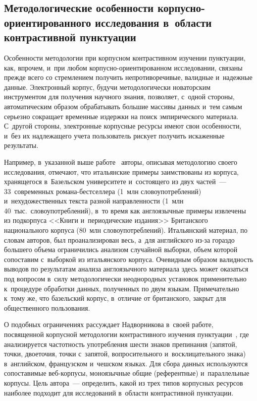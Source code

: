 \begin{multicols}{2}
\vspace*{-6pt}
    
    \section{Методологические особенности  
корпусно-ориентированного исследования в~области 
контрастивной пунктуации}

\vspace*{-3pt}
  
  Особенности методологии при корпусном контрастивном изуче\-нии 
пунктуации, как, впрочем, и~при любом 
 кор\-пус\-но-ори\-ен\-ти\-ро\-ван\-ном исследовании, связаны прежде всего 
со стремлением получить непротиворечивые, валидные и~на\-деж\-ные данные. 
Электронный корпус, будучи методологически новаторским инструментом 
для получения научного знания, поз\-во\-ля\-ет, с~одной стороны, автоматическим 
образом обрабатывать большие массивы данных и~тем самым серьезно 
сокращает временные издержки на поиск эмпирического материала. 
С~другой стороны, электронные корпусные ресурсы имеют свои 
особенности, и~без их над\-ле\-жа\-ще\-го учета пользователь рискует получить 
искаженные результаты.
  
  Например, в~указанной выше работе~\cite[с.~291]{14-nu} авторы, описывая 
методологию своего исследования, отмечают, что итальянские примеры 
заимствованы из корпуса, хранящегося в~Базельском университете 
и~со\-сто\-яще\-го из двух частей~--- 33~современных  
ро\-ма\-на-бест\-сел\-ле\-ра (1~млн словоупотреблений) 
и~нехудожественных текс\-та разной на\-прав\-лен\-ности (1~млн 40~тыс.\ 
словоупотреблений), в~то время как англоязычные примеры извлечены из 
подкорпуса <<Книги и~периодические издания>> Британского 
национального корпуса (80~млн словоупотреблений). Итальянский материал, 
по словам авторов, был проанализирован весь, а~для английского из-за 
гораздо большего объема ограничились анализом случайной выборки, объем 
которой со\-по\-ста\-вим с~выборкой из итальянского корпуса. Очевидным 
образом ва\-лид\-ность выводов по результатам анализа англоязычного 
материала здесь может оказаться под вопросом в~силу методологически 
неоднородных установок применительно к~процедуре обработки данных, 
полученных по двум языкам. Примечательно к~тому же, что базельский 
корпус, в~отличие от британского, за\-крыт для общественного пользования.
  
  О подобных ограничениях рассуждает На\-двор\-ни\-ко\-ва в~своей работе, 
по\-свя\-щен\-ной корпусной методологии контрастивного изучения 
пунктуации~\cite{15-nu}, где анализируется час\-тот\-ность упо\-треб\-ле\-ния шести 
знаков препинания (запятой, точки, двоеточия, точ\-ки с~запятой, 
вопросительного и~восклицательного знака) в~английском, французском 
и~чешском языках. Для сбора данных используются со\-по\-ста\-ви\-мые 
веб-кор\-пу\-сы, моноязычные общие (референтные) и~параллельные корпусы. Цель 
автора~--- определить, какой из трех типов корпусных ресурсов наиболее 
подходит для исследований в~об\-ласти контрастивной пунктуации.
  

\end{multicols}
